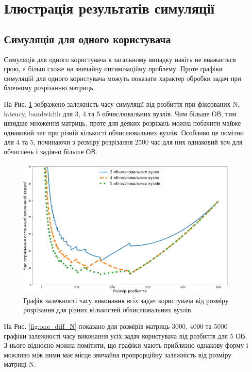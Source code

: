
\section{Ілюстрація результатів симуляції}
\jointitles
\subsection{Симуляція для одного користувача}
Симуляція для одного користувача в загальному випадку навіть не вважається грою, а більш схоже на звичайну оптимізаційну проблему. Проте графіки симуляцій для одного користувача можуть показати характер обробки задач при блочному розрізанню матриць.

На Рис. \ref{fig:one_diff_proc} зображено залежність часу симуляції від розбиття при фіксованих N, latency, bandwidth для 3, 4 та 5 обчислювальних вузлів. Чим більше ОВ, тим швидше множення матриць, проте для деяких розрізань можна побачити майже однаковий час при різній кількості обчислювальних вузлів. Особливо це помітно для 4 та 5, починаючи з розміру розрізання 2500 час для них однаковий хоч для обчислень і задіяно більше ОВ.

\begin{figure}[H]
	\centering
	\includegraphics[width=\textwidth]{practice/img/one_user_different_proc}
	\caption{Графік залежності часу виконання всіх задач користувача від розміру розрізання для різних кількостей обчислювальних вузлів}
	\label{fig:one_diff_proc}
\end{figure}

На Рис. \ref{fig:one_diff_N} показано для розмірів матриць 3000, 4000 та 5000 графіки залежності часу виконання усіх задач користувача від розбиття для 5 ОВ. З нього відносно можна помітити, що графіки мають приблизно однакову форму і можливо між ними має місце звичайна пропрорційну залежність від розміру матриці N.

